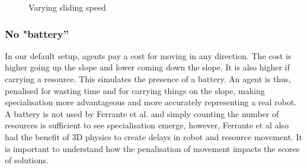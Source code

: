 \documentclass[12pt]{article}
\begin{document}
\begin{appendices}
\begin{figure}[!tbp]
  \hfill
  \hfill
  
  \caption{Varying sliding speed}
  \label{fig:sliding_speed}
\end{figure}

\subsubsection{No "battery''}

In our default setup, agents pay a cost for moving in any direction. The cost is higher going up the slope and lower coming down the slope. It is also higher if carrying a resource. This simulates the presence of a battery. An agent is thus, penalised for wasting time and for carrying things on the slope, making specialisation more advantageous and more accurately representing a real robot. A battery is not used by Ferrante et al. \cite{ferrante:PLOS_CB:2015} and simply counting the number of resources is sufficient to see specialisation emerge, however, Ferrante et al also had the benefit of 3D physics to create delays in robot and resource movement. It is important to understand how the penalisation of movement impacts the scores of solutions.\\


\end{appendices}
\end{document}
